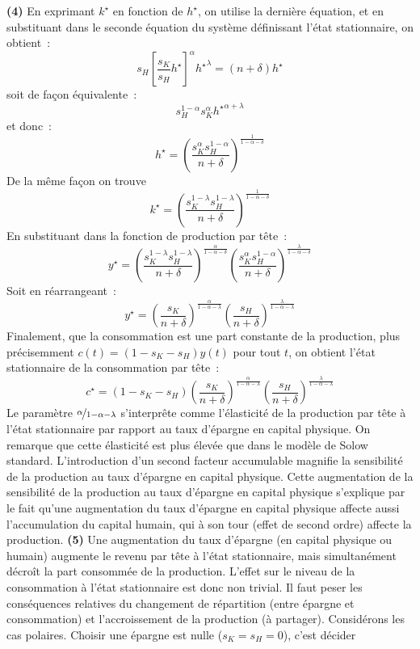 \documentclass[10pt,a4paper,notitlepage,twocolumn]{article}
\newcommand{\question}[1]{\textbf{(#1)}}
\begin{document}
\question{4} En exprimant $k^{\star}$ en fonction de $h^{\star}$, on
utilise la dernière équation, et en substituant dans le seconde
équation du système définissant l'état stationnaire, on obtient :
\[
s_H \left[\frac{s_K}{s_H}h^{\star}\right]^{\alpha}\left. h^{\star}\right. ^{\lambda} = (n+\delta)h^{\star}
\]
soit de façon équivalente :
\[
s_H^{1-\alpha}s_K^{\alpha}\left.h^{\star}\right.^{\alpha+\lambda}
\]
et donc :
\[
h^{\star} = \left(\frac{s_K^{\alpha}s_H^{1-\alpha}}{n+\delta}\right)^{\frac{1}{1-\alpha-\delta}}
\]
De la même façon on trouve
\[
k^{\star} = \left(\frac{s_K^{1-\lambda}s_H^{1-\lambda}}{n+\delta}\right)^{\frac{1}{1-\alpha-\delta}}
\]
En substituant dans la fonction de production par tête :
\[
y^{\star} = \left(\frac{s_K^{1-\lambda}s_H^{1-\lambda}}{n+\delta}\right)^{\frac{\alpha}{1-\alpha-\delta}}\left(\frac{s_K^{\alpha}s_H^{1-\alpha}}{n+\delta}\right)^{\frac{\lambda}{1-\alpha-\delta}}
\]
Soit en réarrangeant :
\[
y^{\star} = \left(\frac{s_{K}}{n+\delta}\right)^{\frac{\alpha}{1-\alpha-\lambda}}\left(\frac{s_{H}}{n+\delta}\right)^{\frac{\lambda}{1-\alpha-\lambda}}
\]
Finalement, que la consommation est une part constante de la
production, plus précisemment $c(t) = (1-s_K-s_H)y(t)$ pour tout $t$,
on obtient l'état stationnaire de la consommation par tête :
\[
c^{\star} = (1-s_{K}-s_{H})\left(\frac{s_{K}}{n+\delta}\right)^{\frac{\alpha}{1-\alpha-\lambda}}\left(\frac{s_{H}}{n+\delta}\right)^{\frac{\lambda}{1-\alpha-\lambda}}
\]
Le paramètre $\nicefrac{\alpha}{1-\alpha-\lambda}$ s'interprête comme
l'élasticité de la production par tête à l'état stationnaire par
rapport au taux d'épargne en capital physique. On remarque que cette
élasticité est plus élevée que dans le modèle de Solow
standard. L'introduction d'un second facteur accumulable magnifie la
sensibilité de la production au taux d'épargne en capital
physique. Cette augmentation de la sensibilité de la production au
taux d'épargne en capital physique s'explique par le fait qu'une
augmentation du taux d'épargne en capital physique affecte aussi
l'accumulation du capital humain, qui à son tour (effet de second
ordre) affecte la production. \question{5} Une augmentation du taux
d'épargne (en capital physique ou humain) augmente le revenu par tête
à l'état stationnaire, mais simultanément décroît la part consommée de
la production. L'effet sur le niveau de la consommation à l'état
stationnaire est donc non trivial. Il faut peser les conséquences
relatives du changement de répartition (entre épargne et consommation)
et l'accroissement de la production (à partager). Considérons les cas
polaires. Choisir une épargne est nulle ($s_K=s_H=0$), c'est décider
\end{document}
